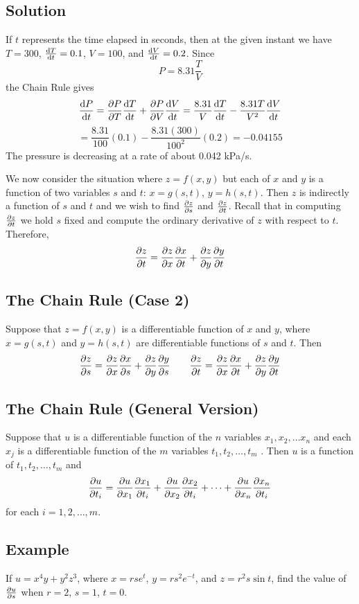 \subsection*{Solution}
If $t$ represents the time elapsed in seconds, then at the given instant we have
$T=300$, $\dv{T}{t}=0.1$, $V=100$, and $\dv{V}{t}=0.2$. Since
$$P=8.31\frac{T}{V}$$
the Chain Rule gives
$$\dv{P}{t}=\pdv{P}{T}\dv{T}{t}+\pdv{P}{V}\dv{V}{t}=\frac{8.31}{V}\dv{T}{t}-
    \frac{8.31T}{V^2}\dv{V}{t}$$
$$=\frac{8.31}{100}(0.1)-\frac{8.31(300)}{100^2}(0.2)=-0.04155$$
The pressure is decreasing at a rate of about 0.042 kPa/s.

We now consider the situation where $z=f(x,y)$ but each of $x$ and $y$ is a function
of two variables $s$ and $t$: $x=g(s,t)$, $y=h(s,t)$. Then $z$ is indirectly a function
of $s$ and $t$ and we wish to find $\pdv{z}{s}$ and $\pdv{z}{t}$. Recall that in
computing $\pdv{z}{t}$ we hold $s$ fixed and compute the ordinary derivative of $z$
with respect to $t$. Therefore,
$$\pdv{z}{t}=\pdv{z}{x}\pdv{x}{t}+\pdv{z}{y}\pdv{y}{t}$$

\subsection*{The Chain Rule (Case 2)}
Suppose that $z = f(x, y)$ is a differentiable function of $x$ and $y$, where
$x = g(s, t)$ and $y = h(s, t)$ are differentiable functions of $s$ and $t$. Then
$$\pdv{z}{s}=\pdv{z}{x}\pdv{x}{s}+\pdv{z}{y}\pdv{y}{s} \qquad
    \pdv{z}{t}=\pdv{z}{x}\pdv{x}{t}+\pdv{z}{y}\pdv{y}{t}$$

\subsection*{The Chain Rule (General Version)}
Suppose that $u$ is a differentiable function of the $n$ variables
$x_1, x_2, \dots x_n$ and each $x_j$ is a differentiable function of the $m$ variables
$t_1,t_2, \dots , t_m$ . Then $u$ is a function of $t_1,t_2, \dots , t_m$ and
$$\pdv{u}{t_i}=\pdv{u}{x_1}\pdv{x_1}{t_i}+\pdv{u}{x_2}\pdv{x_2}{t_i}+\dots+
    \pdv{u}{x_n}\pdv{x_n}{t_i}$$
for each $i=1,2,\dots ,m$.

\subsection*{Example}
If $u=x^4y+y^2z^3$, where $x=rse^t$, $y=rs^2e^{-t}$, and $z=r^2s\sin{t}$, find the
value of $\pdv{u}{s}$ when $r=2$, $s=1$, $t=0$.

